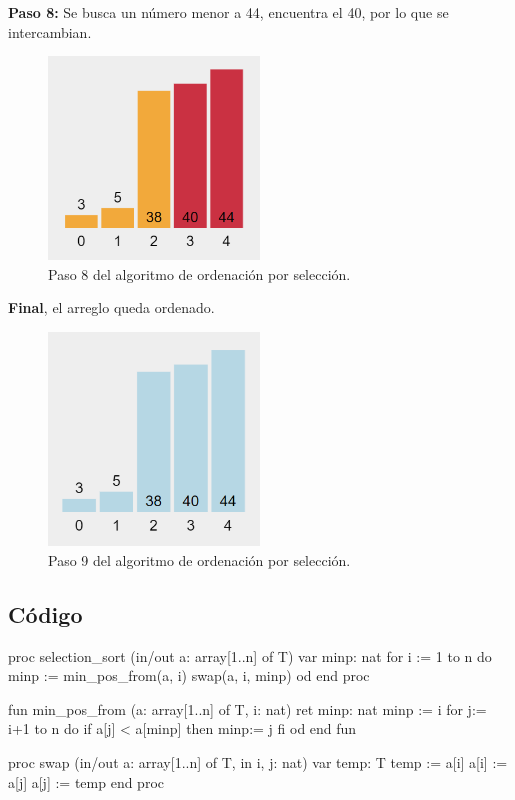 \textbf{Paso 8:} Se busca un número menor a 44, encuentra el 40, por lo que se intercambian.

\begin{figure}[h!]  
    \centering
    \includegraphics[width=0.5\textwidth]{./Images/oe8.png}
    \caption{Paso 8 del algoritmo de ordenación por selección.}
    \label{fig:SelectionSort8}
\end{figure}

\newpage
\textbf{Final}, el arreglo queda ordenado.

\begin{figure}[h!]  
    \centering
    \includegraphics[width=0.5\textwidth]{./Images/oe9.png}
    \caption{Paso 9 del algoritmo de ordenación por selección.}
    \label{fig:SelectionSort9}
\end{figure}

\subsection{Código}

\begin{pascallike}
proc selection_sort (in/out a: array[1..n] of T)
    var minp: nat
    for i := 1 to n do
        minp := min_pos_from(a, i)
        swap(a, i, minp) 
    od
end proc

fun min_pos_from (a: array[1..n] of T, i: nat) ret minp: nat
    minp := i
    for j:= i+1 to n do 
        if a[j] < a[minp] then 
            minp:= j 
        fi
    od
end fun

proc swap (in/out a: array[1..n] of T, in i, j: nat)
    var temp: T
    temp := a[i]
    a[i] := a[j]
    a[j] := temp
end proc
\end{pascallike}

